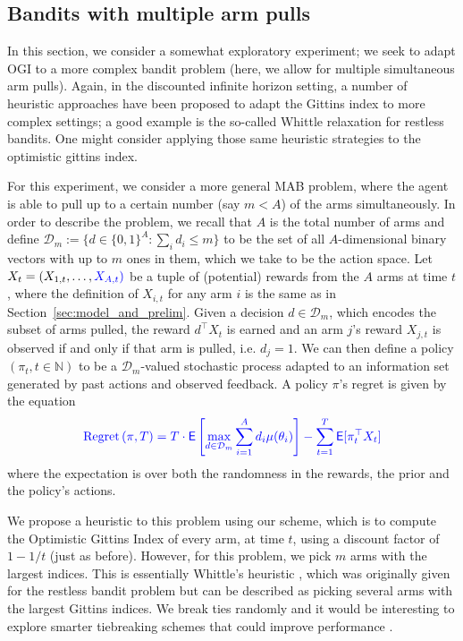\subsection{Bandits with multiple arm pulls}

In this section, we consider a somewhat exploratory experiment; we seek to adapt OGI to a more complex bandit problem (here, we allow for multiple simultaneous arm pulls). Again, in the discounted infinite horizon setting, a number of heuristic approaches have been proposed to adapt the Gittins index to more complex settings; a good example is the so-called Whittle relaxation for restless bandits. One might consider applying those same heuristic strategies to the optimistic gittins index. 

For this experiment, we consider a more general MAB problem, where the agent is able to pull up to a certain number (say $m < A$) of the arms simultaneously. In order to describe the problem, we recall that $A$ is the total number of arms and define  $\mathcal{D}_m := \{d \in \{0,1\}^A : \sum_i d_i \le m\}$ to be the set of all $A$-dimensional binary vectors with up to $m$ ones in them, which we take to be the action space. Let $X_t = (X_{1,t}, \ldots, {\color{blue}X_{A,t})}$ be a tuple of (potential) rewards from the $A$ arms at time $t$, where the definition of $X_{i,t}$ for any arm $i$ is the same as in Section~\ref{sec:model_and_prelim}. Given a decision $d \in \mathcal D_m$, which encodes the subset of arms pulled, the reward $d^\top X_t$ is earned and an arm $j$'s reward $X_{j,t}$ is observed if and only if that arm is pulled, i.e. $d_{j} = 1$. We can then define a policy $(\pi_t, t \in \mathbb{N})$ to be a $\mathcal{D}_m$-valued stochastic process adapted to an information set generated by past actions and observed feedback. 
 A policy $\pi$'s regret is given by the equation 
\[
\color{blue}
\textnormal{Regret} \left( \pi, T \right) = T \cdot  \mathsf{E} \left[ \max_{d \in \mathcal D_m}   \sum_{i=1}^A d_i \mu(\theta_i) \right] - \sum_{t=1}^T \mathsf{E}[\pi_t^\top X_t ]
\]
where the expectation is over both the randomness in the rewards, the prior and the policy's actions.

We propose a heuristic to this problem using our scheme, which is to compute the Optimistic Gittins Index of every arm, at time $t$, using a discount factor of $1-1/t$ (just as before). However, for this problem, we pick $m$ arms with the largest indices. This is essentially Whittle's heuristic \citep{whittle1988restless}, which was originally given for the restless bandit problem but can be described as picking several arms with the largest Gittins indices. {\color{blue} We break ties randomly and it would be interesting to explore smarter tiebreaking schemes that could improve performance \citep{brown2017index}}.

